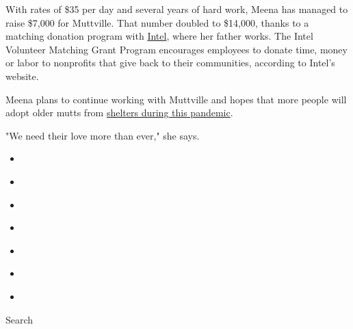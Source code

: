 With rates of \$35 per day and several years of hard work, Meena has
managed to raise \$7,000 for Muttville. That number doubled to \$14,000,
thanks to a matching donation program with
\href{https://www.intel.com/content/www/us/en/corporate-responsibility/intel-matching-grants.html}{Intel},
where her father works. The Intel Volunteer Matching Grant Program
encourages employees to donate time, money or labor to nonprofits that
give back to their communities, according to Intel's website.

Meena plans to continue working with Muttville and hopes that more
people will adopt older mutts from
\href{https://www.cnn.com/videos/tv/2020/04/29/coronavirus-pet-shelters-dog-adoptions-cnnheroes.cnn}{shelters
during this pandemic}.

"We need their love more than ever," she says.

\begin{itemize}
\item
\end{itemize}

\begin{itemize}
\item
\end{itemize}

\begin{itemize}
\item
\end{itemize}

\begin{itemize}
\item
\end{itemize}

\begin{itemize}
\item
\end{itemize}

\begin{itemize}
\item
\end{itemize}

\begin{itemize}
\item
\end{itemize}

Search

